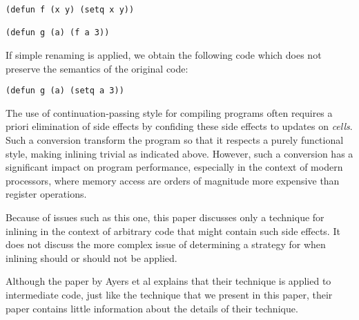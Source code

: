 \begin{verbatim}
(defun f (x y) (setq x y))

(defun g (a) (f a 3))
\end{verbatim}

If simple renaming is applied, we obtain the following code which does
not preserve the semantics of the original code:

\begin{verbatim}
(defun g (a) (setq a 3))
\end{verbatim}

\noindent
The use of continuation-passing style for compiling \commonlisp{}
programs often requires a priori elimination of side effects by
confiding these side effects to updates on \emph{cells}.  Such a
conversion transform the program so that it respects a purely
functional style, making inlining trivial as indicated above.
However, such a conversion has a significant impact on program
performance, especially in the context of modern processors, where
memory access are orders of magnitude more expensive than register
operations.

Because of issues such as this one, this paper discusses only a
technique for inlining in the context of arbitrary \commonlisp{} code
that might contain such side effects.  It does not discuss the more
complex issue of determining a strategy for when inlining should or
should not be applied.

Although the paper by Ayers et al explains that their technique is
applied to intermediate code, just like the technique that we present
in this paper, their paper contains little information about the details
of their technique.

